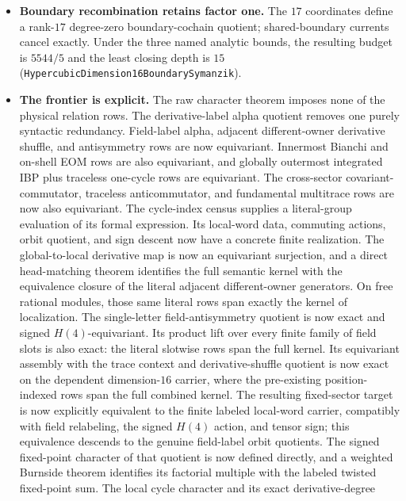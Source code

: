 \documentclass[11pt]{article}
\theoremstyle{definition}
\begin{document}
\begin{itemize}
    $(5/8)a^4M^4$
    (\texttt{HypercubicWilsonSymanzikRestoration}).
  \item \textbf{Boundary recombination retains factor one.} The $17$
    coordinates define a rank-$17$ degree-zero boundary-cochain quotient;
    shared-boundary currents cancel exactly. Under the three named analytic
    bounds, the resulting budget is $5544/5$ and the least closing depth is
    $15$ (\texttt{HypercubicDimension16BoundarySymanzik}).
  \item \textbf{The frontier is explicit.} The raw character theorem imposes
    none of the physical relation rows.  The derivative-label alpha quotient
    removes one purely syntactic redundancy.  Field-label alpha, adjacent
    different-owner derivative shuffle, and antisymmetry rows are now
    equivariant.  Innermost Bianchi and on-shell EOM rows are also equivariant,
    and globally outermost integrated IBP plus traceless one-cycle rows are
    equivariant.  The cross-sector covariant-commutator, traceless
    anticommutator, and fundamental multitrace rows are now also equivariant.
    The cycle-index census supplies a literal-group evaluation of its formal
    expression.  Its local-word data, commuting actions, orbit quotient, and
    sign descent now have a concrete finite realization.  The
    global-to-local derivative map is now an equivariant surjection, and a
    direct head-matching theorem identifies the full semantic kernel with the
    equivalence closure of the literal adjacent different-owner generators.
    On free rational modules, those same literal rows span exactly the kernel
    of localization.
    The single-letter field-antisymmetry quotient is now exact and signed
    $H(4)$-equivariant.  Its product lift over every finite family of field
    slots is also exact: the literal slotwise rows span the full kernel.
    Its equivariant assembly with the trace context and derivative-shuffle
    quotient is now exact on the dependent dimension-$16$ carrier, where the
    pre-existing position-indexed rows span the full combined kernel.  The
    resulting fixed-sector target is now explicitly equivalent to the finite
    labeled local-word carrier, compatibly with field relabeling, the signed
    $H(4)$ action, and tensor sign; this equivalence descends to the genuine
    field-label orbit quotients.  The signed fixed-point character of that
    quotient is now defined directly, and a weighted Burnside theorem
    identifies its factorial multiple with the labeled twisted fixed-point
    sum.  The local cycle character and its exact derivative-degree

\end{itemize}
\end{document}
